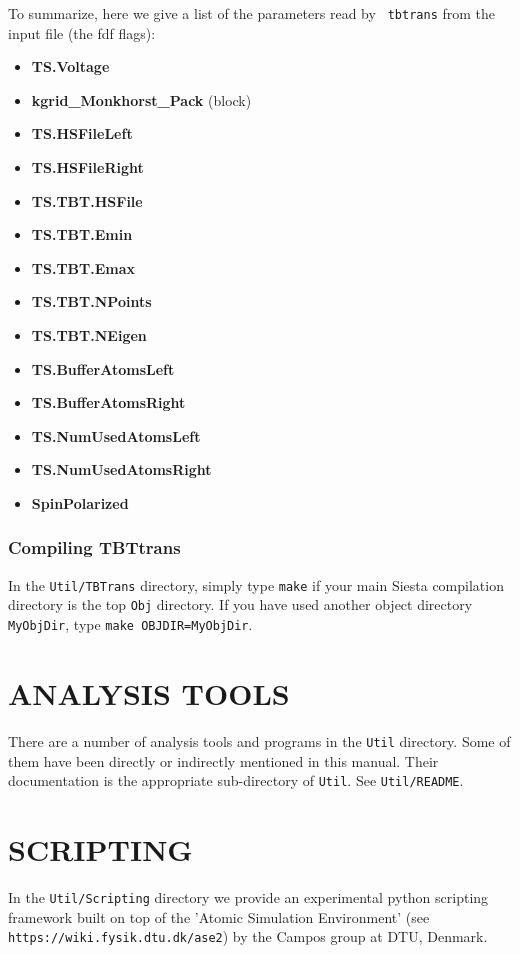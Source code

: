 \documentclass[11pt]{article}
\begin{document}
To summarize, here we give a list of the parameters read by {\tt
  tbtrans} from the input file (the fdf flags):
\begin{itemize}
 \item {\bf TS.Voltage}
 \item {\bf kgrid\_Monkhorst\_Pack} (block)
 \item {\bf TS.HSFileLeft}
 \item {\bf TS.HSFileRight}
 \item {\bf TS.TBT.HSFile}
 \item {\bf TS.TBT.Emin} 
 \item {\bf TS.TBT.Emax} 
 \item {\bf TS.TBT.NPoints}
 \item {\bf TS.TBT.NEigen}
 \item {\bf TS.BufferAtomsLeft}
 \item {\bf TS.BufferAtomsRight}
 \item {\bf TS.NumUsedAtomsLeft}
 \item {\bf TS.NumUsedAtomsRight}
 \item {\bf SpinPolarized}
\end{itemize}

\subsubsection{Compiling TBTtrans}

In the {\tt Util/TBTrans} directory, simply type {\tt make} if your
main {\sc Siesta} compilation directory is the top {\tt Obj}
directory. If you have used another object directory {\tt MyObjDir},
type {\tt make OBJDIR=MyObjDir}.

\section{ANALYSIS TOOLS}

There are a number of analysis tools and programs in the {\tt Util}
directory. Some of them have been directly or indirectly mentioned in
this manual. Their documentation is the appropriate sub-directory of
{\tt Util}. See {\tt Util/README}.

\section{SCRIPTING}

In the {\tt Util/Scripting} directory we provide an experimental
python scripting framework built on top of the 'Atomic Simulation
Environment' (see {\tt https://wiki.fysik.dtu.dk/ase2}) by the Campos
group at DTU, Denmark.
\end{document}

